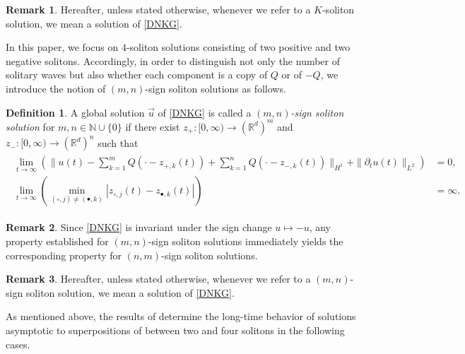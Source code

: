 \documentclass[reqno]{amsart}
\theoremstyle{plain}
\theoremstyle{definition}
\newtheorem{definition}{Definition}[section]
\newtheorem{remark}{Remark}[section]
\numberwithin{equation}{section}
\begin{document}
\begin{remark}
Hereafter, unless stated otherwise, whenever we refer to a $K$-soliton solution, we mean a solution of \eqref{DNKG}.
\end{remark}

In this paper, we focus on $4$-soliton solutions consisting of two positive and two negative solitons. Accordingly, in order to distinguish not only the number of solitary waves but also whether each component is a copy of $Q$ or of $-Q$, we introduce the notion of $(m,n)$-sign soliton solutions as follows.
\begin{definition}\label{defm,nsoli}
A global solution $\vec{u}$ of \eqref{DNKG} is called a \textit{$(m,n)$-sign soliton solution} for $m,n\in\mathbb{N}\cup\{0\}$ if there exist $z_+:[0,\infty)\to (\mathbb{R}^d)^m$ and $z_-:[0,\infty)\to(\mathbb{R}^d)^n$ such that 
\begin{align}
\label{mnsoli}
\begin{aligned}
\lim_{t\to \infty} \left(\|u(t)-\sum_{k=1}^mQ(\cdot-z_{+,k}(t))+\sum_{k=1}^n Q(\cdot-z_{-,k}(t))\|_{H^1}+\|{\partial}_tu(t)\|_{L^2}\right)&=0,
\\
\lim_{t\to\infty}\left( \min_{(\circ,j)\neq (\bullet,k)}|z_{\circ,j}(t)-z_{\bullet,k}(t)|\right)&=\infty.
\end{aligned}
\end{align}
\end{definition}


\begin{remark}
Since \eqref{DNKG} is invariant under the sign change $u\mapsto -u$, any property established for $(m,n)$-sign soliton  solutions immediately yields the corresponding property for $(n,m)$-sign soliton solutions.
\end{remark}
\begin{remark}
Hereafter, unless stated otherwise, whenever we refer to a $(m,n)$-sign soliton solution, we mean a solution of \eqref{DNKG}.
\end{remark}

As mentioned above, the results of \cite{CD,CMYZ,I2,I3} determine the long-time behavior of solutions asymptotic to superpositions of between two and four solitons in the following cases.
\end{document}
